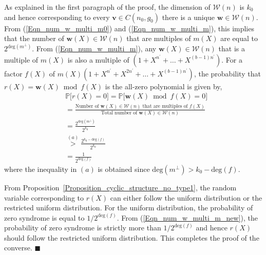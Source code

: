 \documentclass[10pt,journal]{IEEEtran}
\def \deg{{\mathrm{deg}}}
\def \Fig {Fig.}
\begin{document}
As explained in the first paragraph of the proof, the dimension of $\mathcal{W}(n)$ is $k_0$ and hence
corresponding to every $\mathbf{v} \in C(n_0,g_0)$ there is a unique $\mathbf{w} \in \mathcal{W}(n)$.
% 
From (\ref{Eqn_num_w_multi_m0}) and (\ref{Eqn_num_w_multi_m}), 
this implies that the number of $\mathbf{w}(X) \in \mathcal{W}(n)$ that are multiples of $m(X)$ 
are equal to $2^{\deg(m^{\perp})}$.
% 
From (\ref{Eqn_num_w_multi_m}), any $\mathbf{w}(X) \in \mathcal{W}(n)$ that is a multiple of $m(X)$ is also a
multiple of $(1+ X^{n^{\prime}} + \ldots + X^{(b-1)n^{\prime}})$. 
For a factor $f(X)$ of $m(X)(1+X^{n^{\prime}}+X^{2n^{\prime}}+\ldots+X^{(b-1)n^{\prime}})$, 
the probability that $r(X) = \mathbf{w}(X) \bmod f(X)$ is the all-zero polynomial is given by,
% 
\begin{align}
%  
&\mathbb{P} \big[r(X) = 0\big] = \mathbb{P} \big[ \mathbf{w}(X) \bmod f(X) = 0 \big] \nonumber \\
		      &= \frac{\mbox{Number of }\mathbf{w}(X) \in \mathcal{W}(n) \mbox{ that are multiples of } f(X)}{ \mbox{Total number of } \mathbf{w}(X) \in \mathcal{W}(n)}\nonumber  \\
		      &= \frac{2^{\deg(m^{\perp})}}{2^{k_0}}\nonumber  \\
		      & \stackrel{(a)}{>}  \frac{2^{k_0 - \deg(f)}}{2^{k_0}} \nonumber \\
		      &= \frac{1}{2^{\deg(f)}}
\label{Eqn_num_w_multi_m_new}			      
% 
\end{align}
%  
where the inequality in $(a)$ is obtained since $\deg(m^{\perp}) > k_0-\deg(f)$.

From Proposition~\ref{Proposition_cyclic_structure_no_type1},
the random variable corresponding to $r(X)$ can either follow the uniform distribution or the restricted uniform distribution.
% 
For the uniform distribution, the probability of zero syndrome is equal to $1/2^{\deg(f)}$.
From (\ref{Eqn_num_w_multi_m_new}), the probability of zero syndrome is strictly more than $1/2^{\deg(f)}$
and hence $r(X)$ should follow the restricted uniform distribution. This completes the proof of the converse.
% 
\hfill $\blacksquare$


\end{document}
